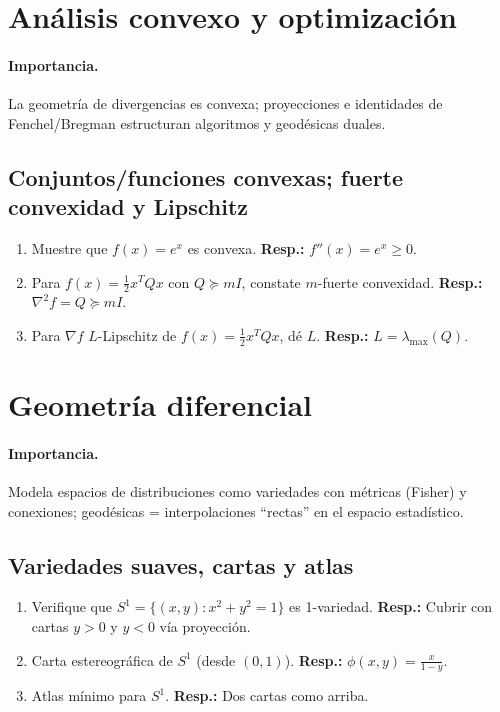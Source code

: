 	\section{Análisis convexo y optimización}
	\paragraph{Importancia.} La geometría de divergencias es convexa; proyecciones e identidades de Fenchel/Bregman estructuran algoritmos y geodésicas duales.
	
	\subsection*{Conjuntos/funciones convexas; fuerte convexidad y Lipschitz}
	\begin{enumerate}
		\item Muestre que $f(x)=e^x$ es convexa. \textbf{Resp.:} $f''(x)=e^x\ge0$.
		\item Para $f(x)=\tfrac12x^TQx$ con $Q\succeq mI$, constate $m$-fuerte convexidad. \textbf{Resp.:} $\nabla^2 f=Q\succeq mI$.
		\item Para $\nabla f$ $L$-Lipschitz de $f(x)=\tfrac12x^TQx$, dé $L$. \textbf{Resp.:} $L=\lambda_{\max}(Q)$.
	\end{enumerate}
	
	\section{Geometría diferencial}
	\paragraph{Importancia.} Modela espacios de distribuciones como variedades con métricas (Fisher) y conexiones; geodésicas = interpolaciones “rectas” en el espacio estadístico.
	
	\subsection*{Variedades suaves, cartas y atlas}
	\begin{enumerate}
		\item Verifique que $S^1=\{(x,y):x^2+y^2=1\}$ es 1-variedad. \textbf{Resp.:} Cubrir con cartas $y>0$ y $y<0$ vía proyección.
		\item Carta estereográfica de $S^1$ (desde $(0,1)$). \textbf{Resp.:} $\phi(x,y)=\frac{x}{1-y}$.
		\item Atlas mínimo para $S^1$. \textbf{Resp.:} Dos cartas como arriba.
	\end{enumerate}
	
